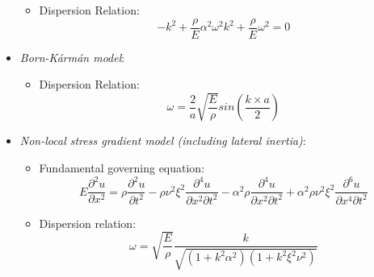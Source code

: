 \begin{itemize}
\begin{itemize}
	\item Dispersion Relation:\\
	\begin{equation}
	-k^2 + \frac{\rho}{E}\alpha^2 \omega^2 k^2 +\frac{\rho}{E}\omega^2 = 0
	\end{equation}
	\end{itemize}
\item \textit{Born-K\'arm\'an model}:\\
	\begin{itemize}
	\item Dispersion Relation:\\
	\begin{equation}
	\omega = \frac{2}{a}\sqrt{\frac{E}{\rho}} sin\left(\frac{k\times a}{2}\right)
	\end{equation}
	\end{itemize}
\item \textit{Non-local stress gradient model (including lateral inertia)}:
	\begin{itemize}
	\item Fundamental governing equation:\\
	\begin{equation}
E \frac{\partial^2 u}{\partial x^2} = \rho \frac{\partial^2 u}{\partial t^2} - \rho \nu^2 \xi^2 \frac{\partial^4 u}{\partial x^2 \partial t^2} - \alpha^2 \rho \frac{\partial^4 u}{\partial x^2 \partial t^2} + \alpha^2 \rho \nu^2 \xi^2 \frac{\partial^6 u}{\partial x^4 \partial t^2}	
	\end{equation}
	\item Dispersion relation:\\
	\begin{equation}
	\omega = \sqrt{\dfrac{E}{\rho}} \dfrac{k}{\sqrt{(1+k^2 \alpha^2)(1+k^2 \xi^2 \nu^2)}}
	\end{equation}
	\end{itemize}
\end{itemize}